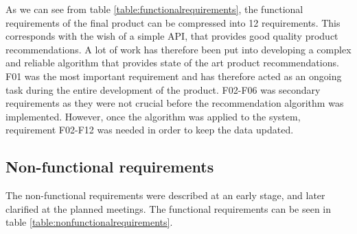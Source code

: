 As we can see from table \ref{table:functionalrequirements}, the functional requirements of the final product can be compressed into 12 requirements. This corresponds with the wish of a simple API, that provides good quality product recommendations. A lot of work has therefore been put into developing a complex and reliable algorithm that provides state of the art product recommendations. F01 was the most important requirement and has therefore acted as an ongoing task during the entire development of the product. F02-F06 was secondary requirements as they were not crucial before the recommendation algorithm was implemented. However, once the algorithm was applied to the system, requirement F02-F12 was needed in order to keep the data updated.

\subsection{Non-functional requirements}
The non-functional requirements were described at an early stage, and later clarified at the planned meetings. The functional requirements can be seen in table \ref{table:nonfunctionalrequirements}.

